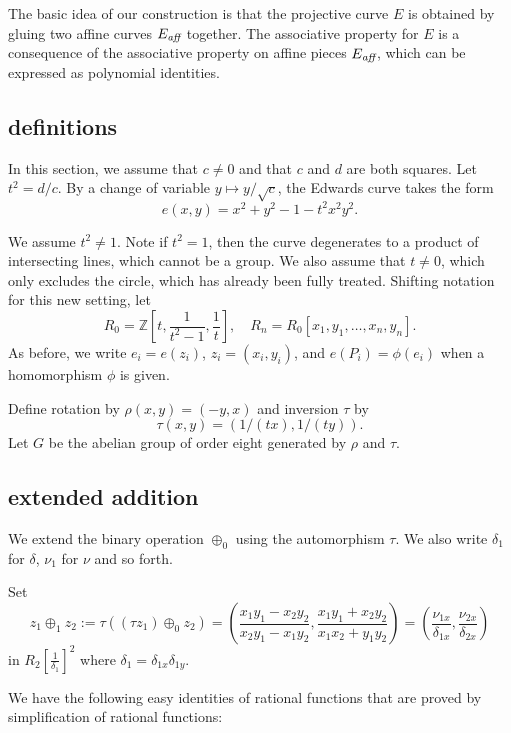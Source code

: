 \documentclass{llncs}
\newcommand{\ring}[1]{\mathbb{#1}}
\newcommand{\op}[1]{\hbox{#1}}
\newcommand{\f}[1]{\frac{1}{#1}}
\newcommand{\Eaff}{E_{\op{\scriptsize\it aff}}}
\begin{document}
The basic idea of our construction is that the projective
curve $E$ is obtained by gluing two affine curves $\Eaff$
together.  The associative property for $E$ is a consequence
of the associative property on affine pieces $\Eaff$, which
can be expressed as polynomial identities.



\subsection{definitions}

In this section, we assume that $c\ne 0$ and that $c$ and $d$ are both
squares.  Let $t^2 = d/c$.  By a change of variable $y\mapsto
y/\sqrt{c}$, the Edwards curve takes the form
\begin{equation}\label{eqn:t}
e(x,y)= x^2 + y^2 -1 - t^2 x^2 y^2.
\end{equation}

We assume $t^2\ne 1$.  Note if $t^2=1$, then 
the curve degenerates to a product of intersecting lines, which
cannot be a group.  We also assume that $t\ne 0$, which only excludes the
circle, which has already been fully treated.  Shifting notation for
this new setting, let
\[
R_0 = \ring{Z}[t,\frac{1}{t^2-1},\frac1t],\quad
R_n = R_0[x_1,y_1,\ldots,x_n,y_n].
\]
As before, we write $e_i = e(z_i)$, $z_i=(x_i,y_i)$, and $ e(P_i) =
\phi(e_i)$ when a homomorphism $\phi$ is given.

Define rotation by $\rho(x,y)=(-y,x)$ and inversion $\tau$ by
\[
\tau(x,y) = (1/(tx),1/(ty)).
\]
Let $G$ be the abelian group of order eight generated by $\rho$ and
$\tau$.


\subsection{extended addition}

We extend the binary operation $\oplus_0$ using the automorphism $\tau$.
We also write $\delta_1$ for
$\delta$, $\nu_1$ for $\nu$ and so forth.

Set
\begin{equation}\label{eqn:tauplus}
  z_1\oplus_1 z_2 := \tau((\tau z_1)\oplus_0 z_2)=
  \left(\frac{x_1y_1 - x_2 y_2}{x_2
    y_1-x_1 y_2},\frac{x_1 y_1 + x_2 y_2}{x_1 x_2 + y_1 y_2}\right) 
= (\frac{\nu_{1x}}{\delta_{1x}},\frac{\nu_{2x}}{\delta_{2x}})
\end{equation}
in $R_2[\f{\delta_1}]^2$ where $\delta_1 = \delta_{1x}\delta_{1y}$.

We have the following easy identities of rational functions that are
proved by simplification of rational functions:
\end{document}
